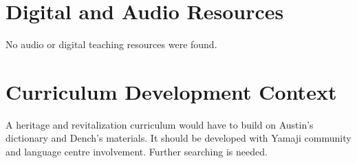 \documentclass[12pt]{article}
\begin{document}
\section{Digital and Audio Resources}
No audio or digital teaching resources were found.

\section{Curriculum Development Context}
A heritage and revitalization curriculum would have to build on Austin's dictionary and Dench's materials. It should be developed with Yamaji community and language centre involvement. Further searching is needed.
\end{document}
